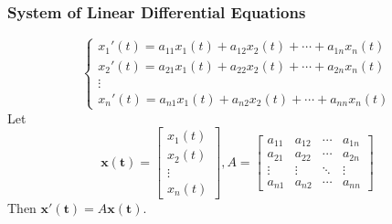 \documentclass[10pt, a4paper]{article}
\newcommand{\vt}[1]{\mathbf{#1}}
\begin{document}
\subsubsection*{System of Linear Differential Equations}
\begin{equation*}
    \begin{cases}
        x_1'(t) = a_{11} x_1(t) + a_{12} x_2(t) + \cdots + a_{1n} x_n(t)\\
        x_2'(t) = a_{21} x_1(t) + a_{22} x_2(t) + \cdots + a_{2n} x_n(t)\\
        \vdots\\
        x_n'(t) = a_{n1} x_1(t) + a_{n2} x_2(t) + \cdots + a_{nn} x_n(t)
    \end{cases}
\end{equation*}
Let \[
\vt{x(t)}=\begin{bmatrix}
    x_1(t)\\
    x_2(t)\\
    \vdots\\
    x_n(t)
\end{bmatrix}
, A=\begin{bmatrix}
    a_{11}&a_{12}&\cdots&a_{1n}\\
    a_{21}&a_{22}&\cdots&a_{2n}\\
    \vdots&\vdots&\ddots&\vdots\\
    a_{n1}&a_{n2}&\cdots&a_{nn}
\end{bmatrix}
\]
Then $\vt{x'(t)}=A\vt{x(t)}$.\\
\end{document}
